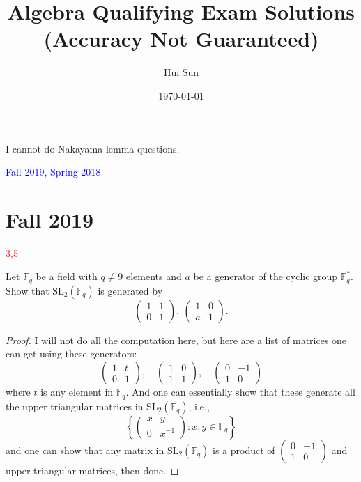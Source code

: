 \documentclass[openany]{book}
\title{Algebra Qualifying Exam Solutions
\\ 
\vspace{0.4cm}
\Large (Accuracy Not Guaranteed)}
\date{\today}
\author{Hui Sun}
\newcommand{\F}{\mathbb{F}}
\begin{document}
\maketitle

\tableofcontents
\newpage


\begin{warn}
    I cannot do Nakayama lemma questions.
\end{warn}


\textcolor{blue}{Fall 2019, Spring 2018}


\chapter{Fall 2019}

\textcolor{red}{3,5}

\begin{prob}
    Let \(\mathbb{F}_{q}\) be a field with \(q\neq 9\) elements and \(a\) be a generator of the cyclic group \(\mathbb{F}^{*}_{q}\). Show that \(\mathrm{SL}_{2}(\mathbb{F}_{q})\) is generated by
    \[\left(\begin{array}{cc}1&1\\0&1\end{array}\right),\ \left(\begin{array}{cc}1&0\\a&1\end{array}\right).\]
\end{prob}
\begin{proof}
    I will not do all the computation here, but here are a list of matrices one can get using these generators:
    \begin{equation*}
        \begin{pmatrix}
            1&t\\
            0&1
        \end{pmatrix}, \quad \begin{pmatrix}
            1&0\\
            1&1
        \end{pmatrix},\quad \begin{pmatrix}
            0&-1\\
            1&0
        \end{pmatrix}
    \end{equation*}
    where $t$ is any element in $\F_q$. And one can essentially show that these generate all the upper triangular matrices in $\text{SL}_2(\F_q)$, i.e.,
    \begin{equation*}
        \left\{\begin{pmatrix}
            x&y\\
            0&x^{-1}
        \end{pmatrix}: x,y\in\F_q\right\}
    \end{equation*}
    and one can show that any matrix in $\text{SL}_2(\F_q)$ is a product of $\begin{pmatrix}
        0&-1\\
        1&0
        \end{pmatrix} $ and upper triangular matrices, then done.
\end{proof}
\end{document}

